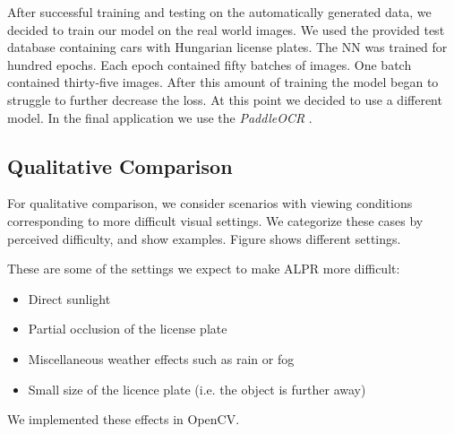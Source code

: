 After successful training and testing on the automatically generated data, we
decided to train our model on the real world images.  We used the provided test
database containing cars with Hungarian license plates.  The \ac{NN} was trained
for hundred epochs.  Each epoch contained fifty batches of images.  One batch
contained thirty-five images.  After this amount of training the model began to
struggle to further decrease the loss.  At this point we decided to use
a different model.  In the final application we use the \emph{PaddleOCR}
\cite{DBLP:journals/corr/abs-2009-09941}.

\subsection{Qualitative Comparison}
For qualitative comparison, we consider scenarios with viewing conditions
corresponding to more difficult visual settings. We categorize these cases by
perceived difficulty, and show examples. Figure  shows
different settings. 

These are some of the settings we expect to make \ac{ALPR} more
difficult:
\begin{itemize}
    \item Direct sunlight 
    \item Partial occlusion of the license plate 
    \item Miscellaneous weather effects such as rain or fog
    \item Small size of the licence plate (i.e. the object is further away)
\end{itemize}

We implemented these effects in OpenCV. 
